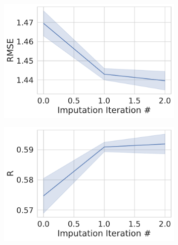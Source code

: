 \documentclass[journal=jmcmar,manuscript=article]{achemso}
\begin{document}
\begin{figure}[tbph]
    \centering
    \begin{subfigure}[t]{0.48\textwidth}
        \centering
        \includegraphics[width=\linewidth]{figures/MedGOEnsRMSE.pdf}
    \end{subfigure}
    \hfill
    \begin{subfigure}[t]{0.48\textwidth}
        \centering
        \includegraphics[width=\linewidth]{figures/MedGOEnsR.pdf}
    \end{subfigure}


\end{figure}
\end{document}
